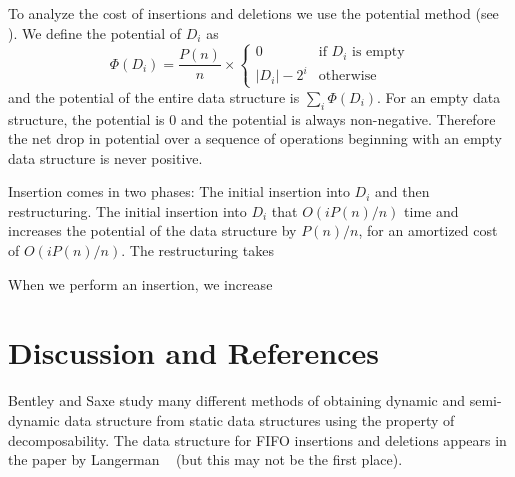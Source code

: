 {To analyze the cost of insertions and deletions we use the potential
method (see ).  We define the potential of $D_i$ as
\[
  \Phi(D_i) = \frac{P(n)}{n}\times \left\{\begin{array}{ll} 
	0 & \mbox{if $D_i$ is empty} \\
	|D_i|-2^i & \mbox{otherwise}
	\end{array}\right.
\]
and the potential of the entire data structure is $\sum_{i}\Phi(D_i)$.
For an empty data structure, the potential is 0 and the potential is
always non-negative.  Therefore the net drop in potential over a
sequence of operations beginning with an empty data structure is never
positive.

Insertion comes in two phases: The initial insertion into $D_i$ and
then restructuring.  The initial insertion into $D_i$ that
$O(iP(n)/n)$ time and increases the potential of the data structure by
$P(n)/n$, for an amortized cost of $O(iP(n)/n)$.  The restructuring
takes 



When we perform an insertion, we increase 
}


\section{Discussion and References}

Bentley and Saxe \cite{bs80} study many different methods of obtaining
dynamic and semi-dynamic data structure from static data structures
using the property of decomposability.  The data structure for FIFO
insertions and deletions appears in the paper by Langerman \etal\
\cite{lms02} (but this may not be the first place).  


